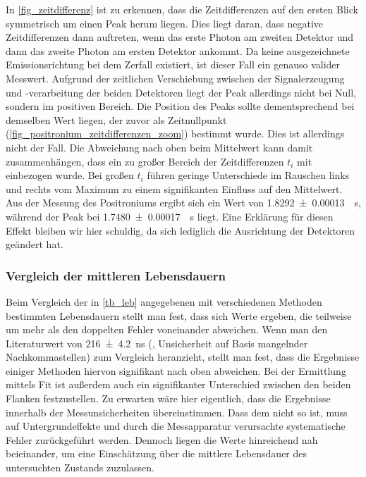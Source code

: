\documentclass[
	a4paper,
	12pt,
	pagesize,
	ngerman
]{scrartcl}
\begin{document}
	In \cref{fig_zeitdifferenz} ist zu erkennen, dass die Zeitdifferenzen auf den ersten Blick symmetrisch um einen Peak herum liegen.
	Dies liegt daran, dass negative Zeitdifferenzen dann auftreten, wenn das erste Photon am zweiten Detektor und dann das zweite Photon am ersten Detektor ankommt.
	Da keine ausgezeichnete Emissionsrichtung bei dem Zerfall existiert, ist dieser Fall ein genauso valider Messwert.
	Aufgrund der zeitlichen Verschiebung zwischen der Signalerzeugung und -verarbeitung der beiden Detektoren liegt der Peak allerdings nicht bei Null, sondern im positiven Bereich.
	Die Position des Peaks sollte dementsprechend bei demselben Wert liegen, der zuvor als Zeitnullpunkt (\cref{fig_positronium_zeitdifferenzen_zoom}) bestimmt wurde.
	Dies ist allerdings nicht der Fall.
	Die Abweichung nach oben beim Mittelwert kann damit zusammenhängen, dass ein zu großer Bereich der Zeitdifferenzen $t_i$ mit einbezogen wurde.
	Bei großen $t_i$ führen geringe Unterschiede im Rauschen links und rechts vom Maximum zu einem signifikanten Einfluss auf den Mittelwert.
	Aus der Messung des Positroniums ergibt sich ein Wert von \SI{1,8292+-0.00013}{\mu s}, während der Peak bei \SI{1,7480+-0.00017}{\mu s} liegt.
	Eine Erklärung für diesen Effekt bleiben wir hier schuldig, da sich lediglich die Ausrichtung der Detektoren geändert hat.


	\subsubsection{Vergleich der mittleren Lebensdauern}
	Beim Vergleich der in \cref{tb_leb} angegebenen mit verschiedenen Methoden bestimmten Lebensdauern stellt man fest, dass sich Werte ergeben, die teilweise um mehr als den doppelten Fehler voneinander abweichen.
	Wenn man den Literaturwert von \SI{216 \pm 4,2}{\nano s} (\cite{Anleitung}, Unsicherheit auf Basis mangelnder Nachkommastellen) zum Vergleich heranzieht, stellt man fest, dass die Ergebnisse einiger Methoden hiervon signifikant nach oben abweichen.
	Bei der Ermittlung mittels Fit ist außerdem auch ein signifikanter Unterschied zwischen den beiden Flanken festzustellen.
	Zu erwarten wäre hier eigentlich, dass die Ergebnisse innerhalb der Messunsicherheiten übereinstimmen.
	Dass dem nicht so ist, muss auf Untergrundeffekte und durch die Messapparatur verursachte systematische Fehler zurückgeführt werden.
	Dennoch liegen die Werte hinreichend nah beieinander, um eine Einschätzung über die mittlere Lebensdauer des untersuchten Zustands zuzulassen.
\end{document}
